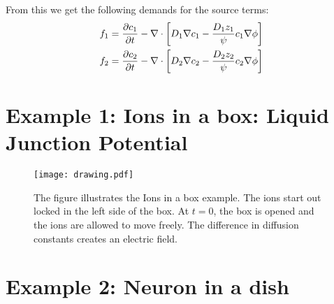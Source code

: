 \documentclass[12pt]{article}
\begin{document}
From this we get the following demands for the source terms: 
\begin{align}
f_1 & = {\partial c_1 \over \partial t} - \nabla \cdot\left[ D_1 \nabla c_1 - {D_1z_1 \over \psi} c_1 \nabla \phi \right] \\ 
f_2 & = {\partial c_2 \over \partial t} - \nabla \cdot\left[ D_2 \nabla c_2 - {D_2z_2 \over \psi} c_2 \nabla \phi \right]
\end{align}

\section{Example 1: Ions in a box: Liquid Junction Potential}
\begin{figure}[h]
\centering
\texttt{[image: drawing.pdf]}
\label{fig:ljp}
\caption{The figure illustrates the Ions in a box example. The ions start out locked in the left side of the box. At $t=0$, the box is opened and the ions are allowed to move freely. The difference in diffusion constants creates an electric field.}
\end{figure}



\section{Example 2: Neuron in a dish}
\end{document}
